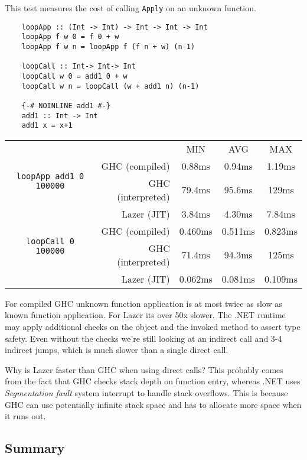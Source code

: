 \documentclass[en]{pracamgr}
\begin{document}
This test measures the cost of calling \texttt{Apply}
on an unknown function.

\begin{verbatim}
    loopApp :: (Int -> Int) -> Int -> Int -> Int
    loopApp f w 0 = f 0 + w
    loopApp f w n = loopApp f (f n + w) (n-1)
    
    loopCall :: Int-> Int-> Int
    loopCall w 0 = add1 0 + w
    loopCall w n = loopCall (w + add1 n) (n-1)
    
    {-# NOINLINE add1 #-}
    add1 :: Int -> Int
    add1 x = x+1
\end{verbatim}

\begin{center}
\begin{tabular}{c r c c c}
    & & MIN & AVG & MAX \\
    \cline{3-5}

    \multirow{2}{*}{\texttt{loopApp add1 0 100000}}
    & GHC (compiled)& 0.88ms & 0.94ms & 1.19ms \\
    & GHC (interpreted)& 79.4ms & 95.6ms & 129ms \\
    & Lazer (JIT)& 3.84ms & 4.30ms & 7.84ms \\
    \cline{2-5}

    \multirow{2}{*}{\texttt{loopCall 0 100000}}
    & GHC (compiled)& 0.460ms & 0.511ms & 0.823ms \\
    & GHC (interpreted)& 71.4ms & 94.3ms & 125ms \\
    & Lazer (JIT)& 0.062ms & 0.081ms & 0.109ms \\
\end{tabular}
\end{center}

For compiled GHC unknown function application is at most
twice as slow as known function application.
For Lazer its over 50x slower. The .NET runtime may
apply additional checks on the object and the invoked
method to assert type safety. Even without the checks
we're still looking at
an indirect call and 3-4 indirect jumps, which is
much slower than a single direct call.

Why is Lazer faster than GHC when using direct calls?
This probably comes from
the fact that GHC checks stack depth on function entry,
whereas .NET uses \textit{Segmentation fault} system interrupt
to handle stack overflows.
This is because GHC can use potentially infinite stack space
and has to allocate more space when it runs out.

\subsection{Summary}
\end{document}
